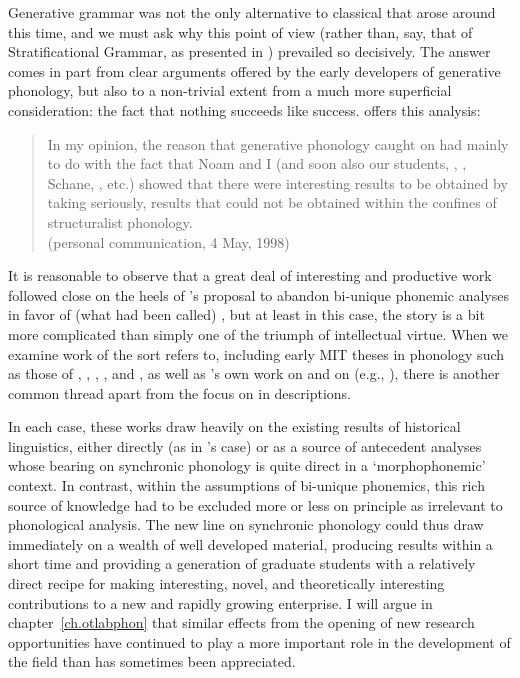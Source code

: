 Generative grammar was not the only alternative to classical  that arose around this time, and we must ask why this
point of view (rather than, say, that of Stratificational Grammar, as
presented in \citealt{lamb66:stratificational.grammar}) prevailed so
decisively. The answer comes in part from clear arguments offered by
the early developers of generative phonology, but also to a
non-trivial extent from a much more superficial consideration: the
fact that nothing succeeds like success. {\Halle} offers this analysis:

\begin{quotation}
  In my opinion, the reason that generative phonology caught on had
  mainly to do with the fact that Noam and I (and soon also our
  students, {\Lightner}, {\McCawley}, Schane, {\Kiparsky}, etc.) showed that
  there were interesting results to be obtained by taking 
  seriously, results that could not be obtained within the confines of
  structuralist phonology.\\
  (personal communication, 4 May, 1998)
\end{quotation}

It is reasonable to observe that a great deal of interesting and
productive work followed close on the heels of {\Halle}'s proposal to
abandon bi-unique phonemic analyses in favor of (what had been called)
, but at least in this case, the story is a bit more
complicated than simply one of the triumph of intellectual virtue.
When we examine work of the sort {\Halle} refers to, including early MIT
theses in phonology such as those of \citet{foley65:thesis},
\citet{harris:thesis}, \citet{kiparsky:thesis},
\citet{mccawley:thesis}, and \citet{schane:thesis}, as well as {\Halle}'s
own work on  and on  (e.g.,
\citealt{halle:zeps:latvian}), there is another common thread apart
from the focus on  in descriptions.

In each case, these works draw heavily on the existing results of
historical linguistics, either directly (as in {\Kiparsky}'s case) or as
a source of antecedent analyses whose bearing on synchronic phonology
is quite direct in a `morphophonemic' context. In {contrast}, within the
assumptions of bi-unique phonemics, this rich source of knowledge had
to be excluded more or less on principle as irrelevant to phonological
analysis. The new line on synchronic phonology could thus draw
immediately on a wealth of well developed material, producing
 results within a short time and providing a generation of
graduate students with a relatively direct recipe for making
interesting, novel, and theoretically interesting contributions to a
new and rapidly growing enterprise. I will argue in
chapter~\ref{ch.otlabphon} that similar effects from the opening of
new research opportunities have continued to play a more important
role in the development of the field than has sometimes been
appreciated.

